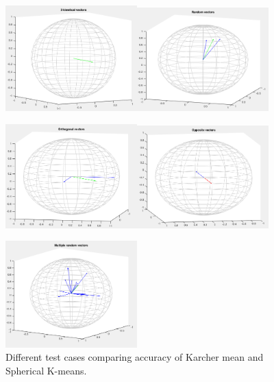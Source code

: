 \documentclass[../tech_report_1.tex]{subfiles}
\begin{document}
\begin{figure}[ht]
\begin{centering}
\includegraphics[width=2in]{fig1}\includegraphics[width=2in]{fig2} 
\par\end{centering}

\begin{centering}
\includegraphics[width=2in]{fig3}\includegraphics[width=2in]{fig4}
\par\end{centering}

\begin{centering}
\includegraphics[width=2in]{fig5.png}
\par\end{centering}

\caption{Different test cases comparing accuracy of Karcher mean and Spherical
K-means.\label{fig:Different-test-cases}}


\end{figure}
\end{document}
